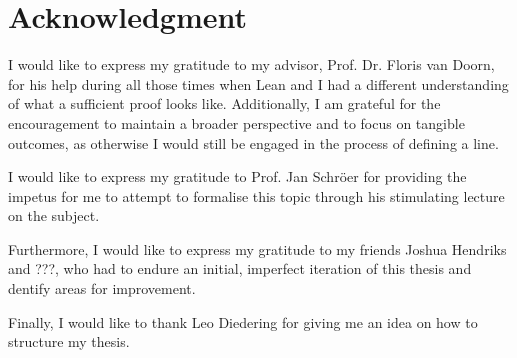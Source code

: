 \section*{Acknowledgment}
I would like to express my gratitude to my advisor, Prof. Dr. Floris van Doorn, for his help during all those times when Lean and I had a different understanding of what a sufficient proof looks like.
Additionally, I am grateful for the encouragement to maintain a broader perspective and to focus on tangible outcomes, as otherwise I would still be engaged in the process of defining a line.

I would like to express my gratitude to Prof. Jan Schröer for providing the impetus for me to attempt to formalise this topic through his stimulating lecture on the subject.

Furthermore, I would like to express my gratitude to my friends Joshua Hendriks and ???, who had to endure an initial, imperfect iteration of this thesis and dentify areas for improvement. 

Finally, I would like to thank Leo Diedering for giving me an idea on how to structure my thesis.
